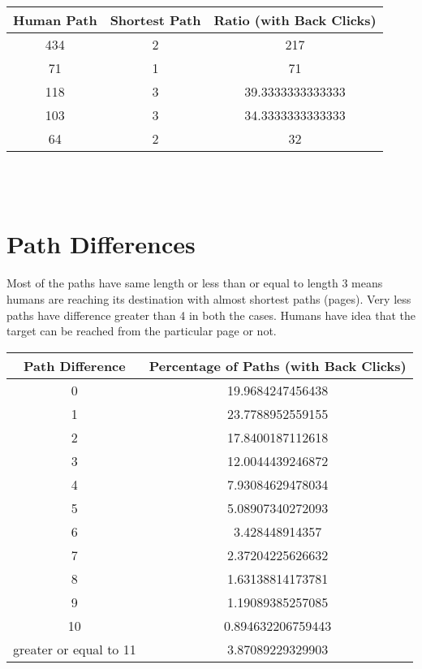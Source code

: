 \documentclass[12pt]{article}
\begin{document}
\begin{center}
 \begin{tabular}{||c c c||} 
 \hline
 Human Path & Shortest Path & Ratio (with Back Clicks)\\ [0.5ex] 
\hline\hline
 434 & 2 & 217\\
 \hline
71 & 1 & 71\\
\hline
118 & 3 & 39.3333333333333\\
\hline
103 & 3 & 34.3333333333333\\
\hline
64 & 2 & 32\\
\hline
\end{tabular}\\ \\
\end{center}


\section{Path Differences }
Most of the paths have same length or less than or equal to length 3 means humans are reaching its destination with almost shortest paths (pages). Very less paths have difference greater than 4 in both the cases. Humans have idea that the target can be reached from the particular page or not. 
\begin{center}
 \begin{tabular}{||c c||} 
 \hline
 Path Difference & Percentage of Paths (with Back Clicks)\\ [0.5ex] 
\hline\hline
0 & 19.9684247456438\\
 \hline
1 & 23.7788952559155\\
\hline
2 & 17.8400187112618\\
\hline
3 & 12.0044439246872\\
\hline
4 & 7.93084629478034\\
\hline
5 & 5.08907340272093\\
 \hline
6 & 3.428448914357\\
\hline
7 & 2.37204225626632\\
\hline
8 & 1.63138814173781\\
\hline
9 & 1.19089385257085\\
\hline
10 & 0.894632206759443\\
\hline
greater or equal to 11 & 3.87089229329903\\
\hline
\end{tabular}\\ \\
\end{center}
\end{document}
